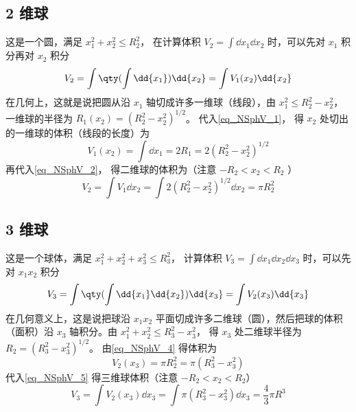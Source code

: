 \subsection{ 2 维球}
这是一个圆，满足 $x_1^2 + x_2^2 \leqslant R_2^2$， 在计算体积 $V_2 = \int \dd{x_1}\dd{x_2}$ 时，可以先对 $x_1$ 积分再对 $x_2$ 积分
\begin{equation}\label{eq_NSphV_2}
V_2 = \int \qty(\int \dd{x_1}) \dd{x_2}  = \int V_1(x_2) \dd{x_2}
\end{equation}
在几何上，这就是说把圆从沿 $x_1$ 轴切成许多一维球（线段），由 $x_1^2 \leqslant R_2^2 - x_2^2$， 一维球的半径为 $R_1(x_2) = (R_2^2 - x_2^2)^{1/2}$。 代入\autoref{eq_NSphV_1}， 得 $x_2$ 处切出的一维球的体积（线段的长度）为
\begin{equation}\label{eq_NSphV_3}
V_1 (x_2) = \int \dd{x_1} = 2R_1 = 2(R_2^2 - x_2^2)^{1/2}
\end{equation}
再代入\autoref{eq_NSphV_2}， 得二维球的体积为（注意 $ -R_2 < x_2 < R_2$ ）
\begin{equation}\label{eq_NSphV_4}
V_2 = \int V_1 \dd{x_2} = \int 2 (R_2^2 - x_2^2)^{1/2} \dd{x_2}  = \pi R_2^2
\end{equation}
\subsection{ 3 维球}
这是一个球体，满足 $x_1^2 + x_2^2 + x_3^2 \leqslant R_3^2$， 计算体积 $V_3 = \int \dd{x_1}\dd{x_2} \dd{x_3}$ 时，可以先对 $x_1 x_2$ 积分
\begin{equation}\label{eq_NSphV_5}
V_3 = \int \qty(\int \dd{x_1} \dd{x_2}) \dd{x_3} = \int V_2(x_3) \dd{x_3}
\end{equation}
在几何意义上，这是说把球沿 $x_1 x_2$ 平面切成许多二维球（圆），然后把球的体积（面积）沿 $x_3$ 轴积分。由 $x_1^2 + x_2^2 \leqslant R_3^2 - x_3^2$， 得 $x_3$ 处二维球半径为 $R_2 = (R_3^2 - x_3^2)^{1/2}$。 由\autoref{eq_NSphV_4} 得体积为
\begin{equation}\label{eq_NSphV_6}
V_2 (x_3) = \pi R_2^2 = \pi (R_3^2 - x_3^2)
\end{equation}
代入\autoref{eq_NSphV_5} 得三维球体积（注意 $-R_2 < x_2 < R_2$）
\begin{equation}\label{eq_NSphV_7}
V_3 = \int V_2(x_3) \dd{x_3} = \int \pi (R_3^2 - x_3^2)\dd{x_3}  = \frac43 \pi R^3
\end{equation}
